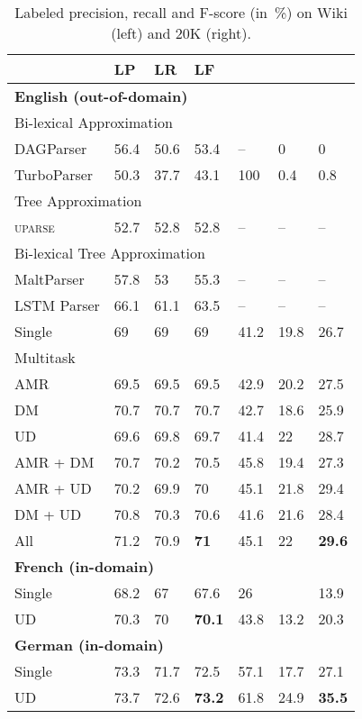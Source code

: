 \documentclass[12pt]{article}
\begin{document}
\begin{table}[t]
\begin{subfigure}[t]{.475\textwidth}
\begin{tabular}{l|lll|lll}
& \textbf{LP} & \textbf{LR} & \textbf{LF} \\
\hline
\multicolumn{4}{l|}{\bf English (out-of-domain)} \\
\multicolumn{4}{l|}{\rule{0pt}{2ex}
Bi-lexical Approximation} \\
DAGParser
& 56.4 & 50.6 & 53.4 & -- & 0 & 0 \\
TurboParser
& 50.3 & 37.7 & 43.1 & 100 & 0.4 & 0.8 \\
\hline
\multicolumn{4}{l|}{\rule{0pt}{2ex}
Tree Approximation} \\
\textsc{uparse}
& 52.7 & 52.8 & 52.8 & -- & -- & -- \\
\hline
\multicolumn{4}{l|}{\rule{0pt}{2ex}
Bi-lexical Tree Approximation} \\
MaltParser
& 57.8 & 53 & 55.3 & -- & -- & -- \\
LSTM Parser
& 66.1 & 61.1 & 63.5 & -- & -- & -- \\
\hline
Single
& 69 & 69 & 69 & 41.2 & 19.8 & 26.7 \\
Multitask &&& \\
AMR
& 69.5 & 69.5 & 69.5 & 42.9 & 20.2 & 27.5 \\
DM
& 70.7 & 70.7 & 70.7 & 42.7 & 18.6 & 25.9 \\
UD
& 69.6 & 69.8 & 69.7 & 41.4 & 22 & 28.7 \\
AMR + DM
& 70.7 & 70.2 & 70.5 & 45.8 & 19.4 & 27.3 \\
AMR + UD
& 70.2 & 69.9 & 70 & 45.1 & 21.8 & 29.4 \\
DM + UD
& 70.8 & 70.3 & 70.6 & 41.6 & 21.6 & 28.4 \\
All
& 71.2 & 70.9 & \textbf{71} & 45.1 & 22 & \textbf{29.6} \\
\hline
\multicolumn{4}{l|}{\bf French (in-domain)} & \\
Single & 68.2 & 67 & 67.6 & 26 & \enskip 9.4 & 13.9 \\
UD & 70.3 & 70 & \textbf{70.1} & 43.8 & 13.2 & 20.3 \\
\hline
\multicolumn{4}{l|}{\bf German (in-domain)} & \\
Single & 73.3 & 71.7 & 72.5 & 57.1 & 17.7 & 27.1 \\
UD & 73.7 & 72.6 & \textbf{73.2} & 61.8 & 24.9 & \textbf{35.5}
\end{tabular}\label{tab:ood_results}
\end{subfigure}
\caption{
Labeled precision, recall and F-score (in~\%)
on Wiki (left) and 20K (right).
}\label{tab:results}
\end{table}
\end{document}
